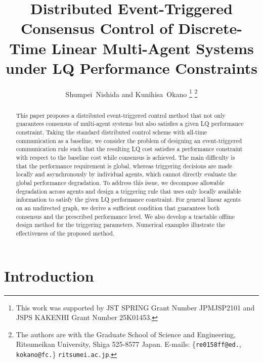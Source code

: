 \documentclass[letterpaper,10pt,conference]{ieeeconf}
\title{\LARGE\textbf{Distributed Event-Triggered Consensus Control of Discrete-Time Linear Multi-Agent Systems under LQ Performance Constraints}}
\author{Shumpei~Nishida and Kunihisa~Okano%
  \thanks{This work was supported by JST SPRING Grant Number JPMJSP2101 and JSPS KAKENHI Grant Number 25K01453.}
  \thanks{The authors are with the Graduate School of Science and Engineering,
    Ritsumeikan University,
    Shiga 525-8577 Japan.
    E-mails: {\footnotesize \{\texttt{re0158ff@ed.}, \texttt{kokano@fc.}\}%
    \texttt{ritsumei.ac.jp}}.}
}
\begin{document}
\maketitle
\thispagestyle{empty}
\pagestyle{empty}

\begin{abstract}
This paper proposes a distributed event-triggered control method that not only guarantees consensus of multi-agent systems but also satisfies a given LQ performance constraint.
Taking the standard distributed control scheme with all-time communication as a baseline, we consider the problem of designing an event-triggered communication rule such that the resulting LQ cost satisfies a performance constraint with respect to the baseline cost while consensus is achieved.
The main difficulty is that the performance requirement is global, whereas triggering decisions are made locally and asynchronously by individual agents, which cannot directly evaluate the global performance degradation.
To address this issue, we decompose allowable degradation across agents and design a triggering rule that uses only locally available information to satisfy the given LQ performance constraint.
For general linear agents on an undirected graph, we derive a sufficient condition that guarantees both consensus and the prescribed performance level.
We also develop a tractable offline design method for the triggering parameters.
Numerical examples illustrate the effectiveness of the proposed method.
\end{abstract}

\section{Introduction}
\end{document}
